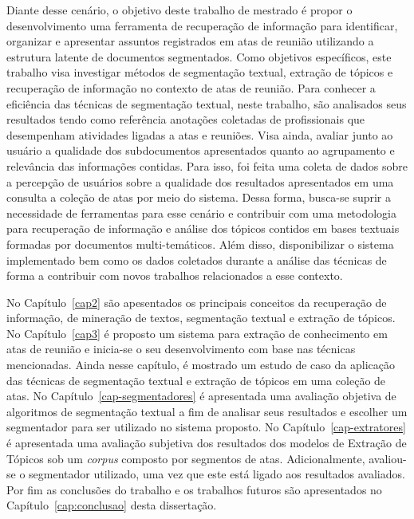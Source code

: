 
Diante desse cenário, o objetivo deste trabalho de mestrado é propor o desenvolvimento uma ferramenta de recuperação de informação para identificar, organizar e apresentar assuntos registrados em atas de reunião utilizando a estrutura latente de documentos segmentados. 
%
Como objetivos específicos, este trabalho visa  
investigar métodos de segmentação textual, extração de tópicos e recuperação de informação no contexto de atas de reunião. Para conhecer a eficiência das técnicas de segmentação textual, neste trabalho, são analisados seus resultados tendo como referência anotações coletadas de profissionais que desempenham atividades ligadas a atas e reuniões.
Visa ainda, avaliar junto ao usuário a qualidade dos subdocumentos apresentados quanto ao agrupamento e relevância das informações contidas. Para isso, foi feita uma coleta de dados sobre a percepção de usuários sobre a qualidade dos resultados apresentados em uma consulta a coleção de atas por meio do sistema.
% 
Dessa forma, busca-se suprir a necessidade de ferramentas para esse cenário e contribuir com uma metodologia para recuperação de informação e análise dos tópicos contidos em bases textuais formadas por documentos multi-temáticos. Além disso, disponibilizar o sistema implementado bem como os dados coletados durante a análise das técnicas de forma a contribuir com novos trabalhos relacionados a esse contexto.





No Capítulo~\ref{cap2} são apesentados os principais conceitos da recuperação de informação, de mineração de textos, segmentação textual e extração de tópicos.
%
No Capítulo~\ref{cap3} é proposto um sistema para extração de conhecimento em atas de reunião e inicia-se o seu desenvolvimento com base nas técnicas mencionadas. 
Ainda nesse capítulo, é mostrado um estudo de caso da aplicação das técnicas de segmentação textual e extração de tópicos em uma coleção de atas. 
%
No Capítulo~\ref{cap-segmentadores} é apresentada uma avaliação objetiva de algoritmos de segmentação textual a fim de analisar seus resultados e escolher um segmentador para ser utilizado no sistema proposto.
%
No Capítulo~\ref{cap-extratores} é apresentada uma avaliação subjetiva dos resultados dos modelos de Extração de Tópicos sob um \textit{corpus} composto por segmentos de atas. Adicionalmente, avaliou-se o segmentador utilizado, uma vez que este está ligado aos resultados avaliados. 
%
Por fim as conclusões do trabalho e os trabalhos futuros são apresentados no Capítulo~\ref{cap:conclusao} desta dissertação.





